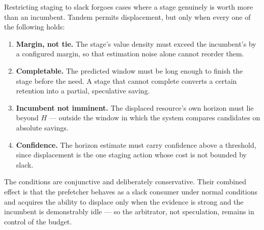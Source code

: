 \documentclass[10pt,twocolumn]{article}
\newcommand{\sysname}{Tandem\xspace}   %
\begin{document}
Restricting staging to slack forgoes cases where a stage genuinely is worth
more than an incumbent. \sysname permits displacement, but only when every
one of the following holds:

\begin{enumerate}\itemsep2pt
\item \textbf{Margin, not tie.} The stage's value density must exceed the
      incumbent's by a configured margin, so that estimation noise alone
      cannot reorder them.
\item \textbf{Completable.} The predicted window must be long enough to
      finish the stage before the need. A stage that cannot complete converts
      a certain retention into a partial, speculative saving.
\item \textbf{Incumbent not imminent.} The displaced resource's own horizon
      must lie beyond $H$ --- outside the window in which the system compares
      candidates on absolute savings.
\item \textbf{Confidence.} The horizon estimate must carry confidence above a
      threshold, since displacement is the one staging action whose cost is
      not bounded by slack.
\end{enumerate}

\noindent The conditions are conjunctive and deliberately conservative. Their
combined effect is that the prefetcher behaves as a slack consumer under
normal conditions and acquires the ability to displace only when the evidence
is strong and the incumbent is demonstrably idle --- so the arbitrator, not
speculation, remains in control of the budget.
\end{document}
